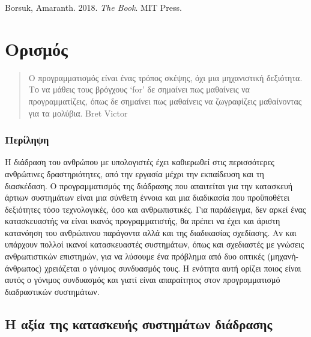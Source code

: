 \documentclass[
]{article}
\begin{document}
Borsuk, Amaranth. 2018. \emph{The Book}. MIT Press.

\hypertarget{ux3bfux3c1ux3b9ux3c3ux3bcux3ccux3c2}{%
\section{Ορισμός}\label{ux3bfux3c1ux3b9ux3c3ux3bcux3ccux3c2}}

\begin{quote}
Ο προγραμματισμός είναι ένας τρόπος σκέψης, όχι μια μηχανιστική
δεξιότητα. Το να μάθεις τους βρόγχους `for' δε σημαίνει πως μαθαίνεις να
προγραμματίζεις, όπως δε σημαίνει πως μαθαίνεις να ζωγραφίζεις
μαθαίνοντας για τα μολύβια. Bret Victor
\end{quote}

\hypertarget{ux3c0ux3b5ux3c1ux3afux3bbux3b7ux3c8ux3b7}{%
\subsubsection{Περίληψη}\label{ux3c0ux3b5ux3c1ux3afux3bbux3b7ux3c8ux3b7}}

Η διάδραση του ανθρώπου με υπολογιστές έχει καθιερωθεί στις περισσότερες
ανθρώπινες δραστηριότητες, από την εργασία μέχρι την εκπαίδευση και τη
διασκέδαση. Ο προγραμματισμός της διάδρασης που απαιτείται για την
κατασκευή άρτιων συστημάτων είναι μια σύνθετη έννοια και μια διαδικασία
που προϋποθέτει δεξιότητες τόσο τεχνολογικές, όσο και ανθρωπιστικές. Για
παράδειγμα, δεν αρκεί ένας κατασκευαστής να είναι ικανός
προγραμματιστής, θα πρέπει να έχει και άριστη κατανόηση του ανθρώπινου
παράγοντα αλλά και της διαδικασίας σχεδίασης. Αν και υπάρχουν πολλοί
ικανοί κατασκευαστές συστημάτων, όπως και σχεδιαστές με γνώσεις
ανθρωπιστικών επιστημών, για να λύσουμε ένα πρόβλημα από δυο οπτικές
(μηχανή-άνθρωπος) χρειάζεται ο γόνιμος συνδυασμός τους. Η ενότητα αυτή
ορίζει ποιος είναι αυτός ο γόνιμος συνδυασμός και γιατί είναι
απαραίτητος στον προγραμματισμό διαδραστικών συστημάτων.

\hypertarget{ux3b7-ux3b1ux3beux3afux3b1-ux3c4ux3b7ux3c2-ux3baux3b1ux3c4ux3b1ux3c3ux3baux3b5ux3c5ux3aeux3c2-ux3c3ux3c5ux3c3ux3c4ux3b7ux3bcux3acux3c4ux3c9ux3bd-ux3b4ux3b9ux3acux3b4ux3c1ux3b1ux3c3ux3b7ux3c2}{%
\subsection{Η αξία της κατασκευής συστημάτων
διάδρασης}\label{ux3b7-ux3b1ux3beux3afux3b1-ux3c4ux3b7ux3c2-ux3baux3b1ux3c4ux3b1ux3c3ux3baux3b5ux3c5ux3aeux3c2-ux3c3ux3c5ux3c3ux3c4ux3b7ux3bcux3acux3c4ux3c9ux3bd-ux3b4ux3b9ux3acux3b4ux3c1ux3b1ux3c3ux3b7ux3c2}}
\end{document}
